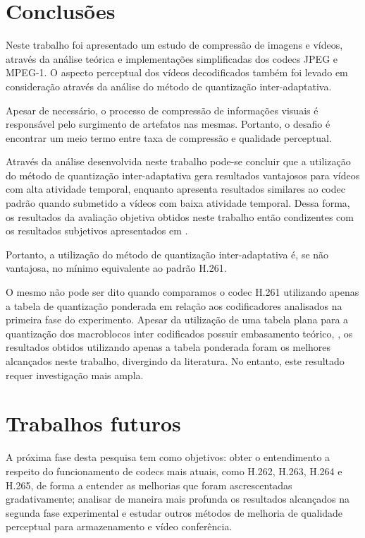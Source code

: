 
\thispagestyle{fancy}

\section{Conclusões}

Neste trabalho foi apresentado um estudo de compressão de imagens e vídeos, através da análise teórica e implementações simplificadas dos codecs JPEG e MPEG-1. O aspecto perceptual dos vídeos decodificados também foi levado em consideração através da análise do método de quantização inter-adaptativa.

Apesar de necessário, o processo de compressão de informações visuais é responsável pelo surgimento de artefatos nas mesmas. Portanto, o desafio é encontrar um meio termo entre taxa de compressão e qualidade perceptual.

Através da análise desenvolvida neste trabalho pode-se concluir que a utilização do método de quantização inter-adaptativa gera resultados vantajosos para vídeos com alta atividade temporal, enquanto apresenta resultados similares ao codec padrão quando submetido a vídeos com baixa atividade temporal. Dessa forma, os resultados da avaliação objetiva obtidos neste trabalho então condizentes com os resultados subjetivos apresentados em \cite{Li_humanvisual}.

Portanto, a utilização do método de quantização inter-adaptativa é, se não vantajosa, no mínimo equivalente ao padrão H.261.

O mesmo não pode ser dito quando comparamos o codec H.261 utilizando apenas a tabela de quantização ponderada em relação aos codificadores analisados na primeira fase do experimento. Apesar da utilização de uma tabela plana para a quantização dos macroblocos inter codificados possuir embasamento teórico, \cite{ghanbari2003standard}, os resultados obtidos utilizando apenas a tabela ponderada foram os melhores alcançados neste trabalho, divergindo da literatura. No entanto, este resultado requer investigação mais ampla.

\section{Trabalhos futuros}

A próxima fase desta pesquisa tem como objetivos: obter o entendimento a respeito do funcionamento  de codecs mais atuais, como H.262, H.263, H.264 e H.265, de forma a entender as melhorias que foram ascrescentadas gradativamente; analisar de maneira mais profunda os resultados alcançados na segunda fase experimental e estudar outros métodos de melhoria de qualidade perceptual para armazenamento e vídeo conferência.